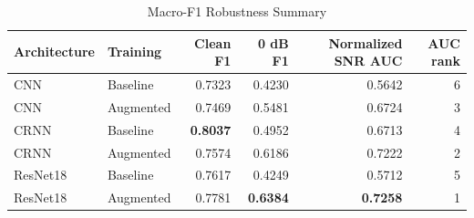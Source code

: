 \begin{table}[t]
  \caption{Macro-F1 Robustness Summary}
  \label{tab:robustness-summary}
  \centering
  \begin{tabular}{llrrrr}
    \toprule
    Architecture & Training & Clean F1 & 0 dB F1 & Normalized SNR AUC & AUC rank \\
    \midrule
    CNN & Baseline & 0.7323 & 0.4230 & 0.5642 & 6 \\
    CNN & Augmented & 0.7469 & 0.5481 & 0.6724 & 3 \\
    CRNN & Baseline & \textbf{0.8037} & 0.4952 & 0.6713 & 4 \\
    CRNN & Augmented & 0.7574 & 0.6186 & 0.7222 & 2 \\
    ResNet18 & Baseline & 0.7617 & 0.4249 & 0.5712 & 5 \\
    ResNet18 & Augmented & 0.7781 & \textbf{0.6384} & \textbf{0.7258} & 1 \\
    \bottomrule
  \end{tabular}
\end{table}

